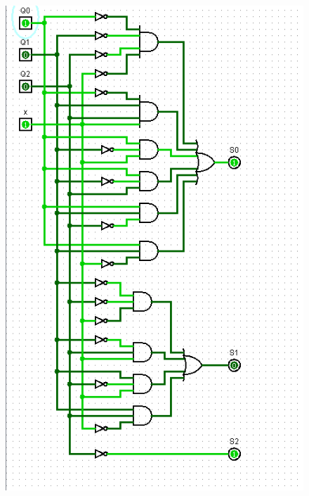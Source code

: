 \documentclass[]{article}
\begin{document}
\begin{minipage}{0.5\textwidth}
\begin{figure}[H]
	\centering
	\includegraphics[width=1\textwidth]{test1_4.png}
\end{figure}
\end{minipage}
\end{document}

